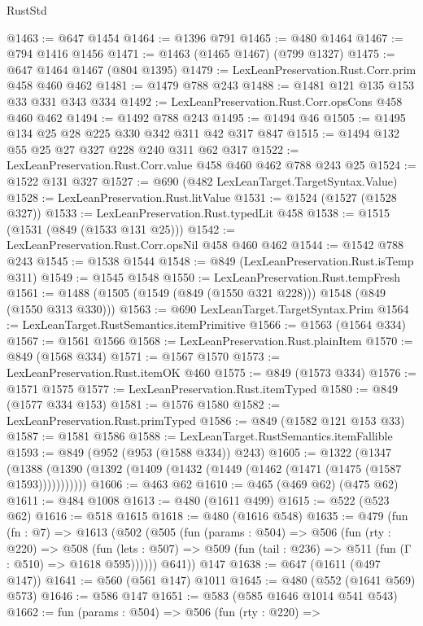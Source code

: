 \begin{lexlean}{RustStd}
\begin{coremodule}
{\begin{coremodule}
{{{{{{{{{@1463 := @647 @1454
@1464 := @1396 @791
@1465 := @480 @1464
@1467 := @794 @1416 @1456
@1471 := @1463 (@1465 @1467) (@799 @1327)
@1475 := @647 @1464 @1467 (@804 @1395)
@1479 := LexLeanPreservation.Rust.Corr.prim @458 @460 @462
@1481 := @1479 @788 @243
@1488 := @1481 @121 @135 @153 @33 @331 @343 @334
@1492 := LexLeanPreservation.Rust.Corr.opsCons @458 @460 @462
@1494 := @1492 @788 @243
@1495 := @1494 @46
@1505 := @1495 @134 @25 @28 @225 @330 @342 @311 @42 @317 @847
@1515 := @1494 @132 @55 @25 @27 @327 @228 @240 @311 @62 @317
@1522 := LexLeanPreservation.Rust.Corr.value @458 @460 @462 @788 @243 @25
@1524 := @1522 @131 @327
@1527 := @690 (@482 LexLeanTarget.TargetSyntax.Value)
@1528 := LexLeanPreservation.Rust.litValue
@1531 := @1524 (@1527 (@1528 @327))
@1533 := LexLeanPreservation.Rust.typedLit @458
@1538 := @1515 (@1531 (@849 (@1533 @131 @25)))
@1542 := LexLeanPreservation.Rust.Corr.opsNil @458 @460 @462
@1544 := @1542 @788 @243
@1545 := @1538 @1544
@1548 := @849 (LexLeanPreservation.Rust.isTemp @311)
@1549 := @1545 @1548
@1550 := LexLeanPreservation.Rust.tempFresh
@1561 := @1488 (@1505 (@1549 (@849 (@1550 @321 @228))) @1548 (@849 (@1550 @313 @330)))
@1563 := @690 LexLeanTarget.TargetSyntax.Prim
@1564 := LexLeanTarget.RustSemantics.itemPrimitive
@1566 := @1563 (@1564 @334)
@1567 := @1561 @1566
@1568 := LexLeanPreservation.Rust.plainItem
@1570 := @849 (@1568 @334)
@1571 := @1567 @1570
@1573 := LexLeanPreservation.Rust.itemOK @460
@1575 := @849 (@1573 @334)
@1576 := @1571 @1575
@1577 := LexLeanPreservation.Rust.itemTyped
@1580 := @849 (@1577 @334 @153)
@1581 := @1576 @1580
@1582 := LexLeanPreservation.Rust.primTyped
@1586 := @849 (@1582 @121 @153 @33)
@1587 := @1581 @1586
@1588 := LexLeanTarget.RustSemantics.itemFallible
@1593 := @849 (@952 (@953 (@1588 @334)) @243)
@1605 := @1322
    (@1347 (@1388 (@1390 (@1392 (@1409 (@1432 (@1449 (@1462 (@1471 (@1475 (@1587 @1593)))))))))))
@1606 := @463 @62
@1610 := @465 (@469 @62) (@475 @62)
@1611 := @484 @1008
@1613 := @480 (@1611 @499)
@1615 := @522 (@523 @62)
@1616 := @518 @1615
@1618 := @480 (@1616 @548)
@1635 := @479
    (fun (fn : @7) =>
    @1613
      (@502
        (@505
          (fun (params : @504) =>
          @506
            (fun (rty : @220) =>
            @508
              (fun (lets : @507) =>
              @509 (fun (tail : @236) => @511 (fun (Γ : @510) => @1618 @595))))))
        @641))
    @147
@1638 := @647 (@1611 (@497 @147))
@1641 := @560 (@561 @147) @1011
@1645 := @480 (@552 (@1641 @569) @573)
@1646 := @586 @147
@1651 := @583 (@585 @1646 @1014 @541 @543)
@1662 := fun (params : @504) =>
  @506
    (fun (rty : @220) =>
}}}}}}}}}
\end{coremodule}}
\end{coremodule}
\end{lexlean}
